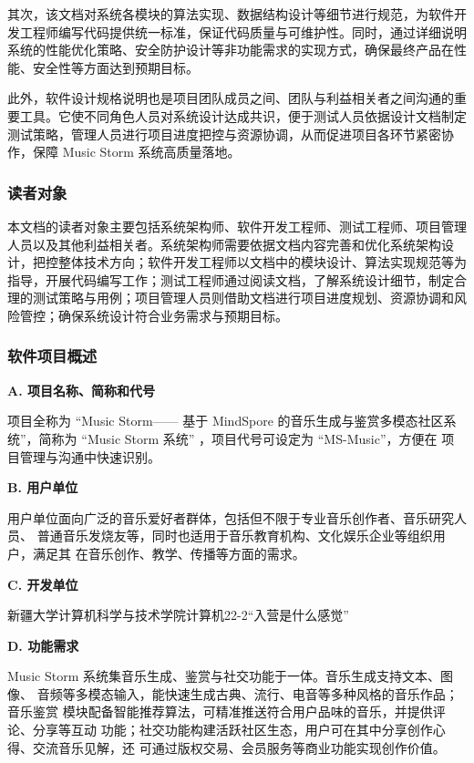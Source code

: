 \documentclass{base}
\begin{document}
其次，该文档对系统各模块的算法实现、数据结构设计等细节进行规范，为软件开发工程师编写代码提供统一标准，保证代码质量与可维护性。同时，通过详细说明系统的性能优化策略、安全防护设计等非功能需求的实现方式，确保最终产品在性能、安全性等方面达到预期目标。

此外，软件设计规格说明也是项目团队成员之间、团队与利益相关者之间沟通的重要工具。它使不同角色人员对系统设计达成共识，便于测试人员依据设计文档制定测试策略，管理人员进行项目进度把控与资源协调，从而促进项目各环节紧密协作，保障 Music Storm 系统高质量落地。

\subsubsection{读者对象}

本文档的读者对象主要包括系统架构师、软件开发工程师、测试工程师、项目管理人员以及其他利益相关者。系统架构师需要依据文档内容完善和优化系统架构设计，把控整体技术方向；软件开发工程师以文档中的模块设计、算法实现规范等为指导，开展代码编写工作；测试工程师通过阅读文档，了解系统设计细节，制定合理的测试策略与用例；项目管理人员则借助文档进行项目进度规划、资源协调和风险管控；确保系统设计符合业务需求与预期目标。

\subsubsection{软件项目概述}

\textbf{A. 项目名称、简称和代号​}

项目全称为 “Music Storm—— 基于 MindSpore 的音乐生成与鉴赏多模态社区系	统”，简称为 “Music Storm 系统” ，项目代号可设定为 “MS-Music”，方便在	项目管理与沟通中快速识别。​

\textbf{B. 用户单位​}

用户单位面向广泛的音乐爱好者群体，包括但不限于专业音乐创作者、音乐研究人员、	普通音乐发烧友等，同时也适用于音乐教育机构、文化娱乐企业等组织用户，满足其	在音乐创作、教学、传播等方面的需求。​

\textbf{C. 开发单位​}

新疆大学计算机科学与技术学院计算机22-2“入营是什么感觉”

\textbf{D. 功能需求​}

Music Storm 系统集音乐生成、鉴赏与社交功能于一体。音乐生成支持文本、图像、	音频等多模态输入，能快速生成古典、流行、电音等多种风格的音乐作品；音乐鉴赏	模块配备智能推荐算法，可精准推送符合用户品味的音乐，并提供评论、分享等互动	功能；社交功能构建活跃社区生态，用户可在其中分享创作心得、交流音乐见解，还	可通过版权交易、会员服务等商业功能实现创作价值。
\end{document}
